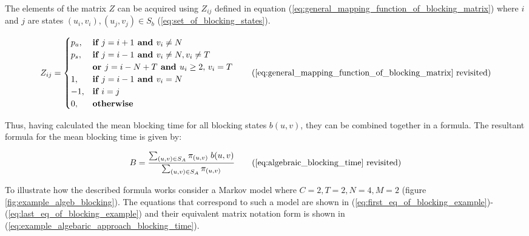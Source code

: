     The elements of the matrix \(Z\) can be acquired using \(Z_{ij}\) defined in 
    equation (\ref{eq:general_mapping_function_of_blocking_matrix}) where \(i\) 
    and \(j\) are states \((u_i, v_i), (u_j, v_j) \in S_b\) 
    (\ref{eq:set_of_blocking_states}).

    \begin{equation}
    Z_{ij} = 
    \begin{cases}
        p_a, & \textbf{if } j = i + 1 \textbf{ and } v_i \neq N \\
        p_s, & \textbf{if } j = i - 1 \textbf{ and } v_i \neq N, v_i \neq T \\
            & \textbf{or } j = i - N + T \textbf{ and } u_i \geq 2,\,v_i = T \\
        1, & \textbf{if } j = i - 1 \textbf{ and } v_i = N \\
        -1, & \textbf{if } i = j \\
        0, & \textbf{otherwise} \\
    \end{cases}
    \tag{\ref{eq:general_mapping_function_of_blocking_matrix} revisited}
\end{equation}


Thus, having calculated the mean blocking time for all blocking states 
\(b(u,v)\), they can be combined together in a formula.
The resultant formula for the mean blocking time is given by:

\begin{equation}
    B = \frac{\sum_{(u,v) \in S_A} \pi_{(u,v)} \; b(u,v)}{\sum_{(u,v) \in S_A} 
    \pi_{(u,v)}} \tag{\ref{eq:algebraic_blocking_time} revisited}
\end{equation}

To illustrate how the described formula works consider a Markov model where 
\(C=2, T=2, N=4, M=2\) (figure \ref{fig:example_algeb_blocking}). 
The equations that correspond to such a model are shown in 
(\ref{eq:first_eq_of_blocking_example})-(\ref{eq:last_eq_of_blocking_example}) 
and their equivalent matrix notation form is shown in 
(\ref{eq:example_algebaric_approach_blocking_time}).

